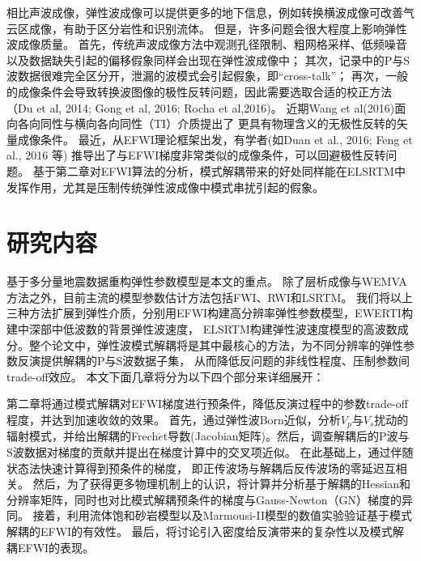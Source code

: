 相比声波成像，弹性波成像可以提供更多的地下信息，例如转换横波成像可改善气云区成像，有助于区分岩性和识别流体。
但是，许多问题会很大程度上影响弹性波成像质量。
首先，传统声波成像方法中观测孔径限制、粗网格采样、低频噪音以及数据缺失引起的偏移假象同样会出现在弹性波成像中；
其次，记录中的P与S波数据很难完全区分开，泄漏的波模式会引起假象，即“cross-talk”；
再次，一般的成像条件会导致转换波图像的极性反转问题，因此需要选取合适的校正方法（Du et al,
2014\cite{DuEtAl2014}; Gong et al, 2016\cite{GongEtAl2016}; Rocha et al,2016\cite{RochaEtAl2016a})。
近期Wang et al(2016)\cite{WangChenlongEtAl2016}面向各向同性与横向各向同性（TI）介质提出了
更具有物理含义的无极性反转的矢量成像条件。
最近，从EFWI理论框架出发，有学者(如Duan et al., 2016\cite{Duan2016}; Feng et al., 2016\cite{Feng2016} 等)
推导出了与EFWI梯度非常类似的成像条件，可以回避极性反转问题。
基于第二章对EFWI算法的分析，模式解耦带来的好处同样能在ELSRTM中发挥作用，尤其是压制传统弹性波成像中模式串扰引起的假象。


\section{研究内容}
基于多分量地震数据重构弹性参数模型是本文的重点。
除了层析成像与WEMVA方法之外，目前主流的模型参数估计方法包括FWI、RWI和LSRTM。
我们将以上三种方法扩展到弹性介质，分别用EFWI构建高分辨率弹性参数模型，EWERTI构建中深部中低波数的背景弹性波速度，
ELSRTM构建弹性波速度模型的高波数成分。整个论文中，弹性波模式解耦将是其中最核心的方法，为不同分辨率的弹性参数反演提供解耦的P与S波数据子集，
从而降低反问题的非线性程度、压制参数间trade-off效应。
本文下面几章将分为以下四个部分来详细展开：

第二章将通过模式解耦对EFWI梯度进行预条件，降低反演过程中的参数trade-off程度，并达到加速收敛的效果。
首先，通过弹性波Born近似，分析$V_p$与$V_s$扰动的
辐射模式，并给出解耦的Frech{$\acute{e}$}t导数(Jacobian矩阵)。然后，调查解耦后的P波与S波数据对梯度的贡献并提出在梯度计算中的交叉项近似。
在此基础上，通过伴随状态法快速计算得到预条件的梯度，
即正传波场与解耦后反传波场的零延迟互相关。
然后，为了获得更多物理机制上的认识，将计算并分析基于解耦的Hessian和分辨率矩阵，同时也对比模式解耦预条件的梯度与Gauss-Newton（GN）梯度的异同。
接着，利用流体饱和砂岩模型以及Marmousi-II模型的数值实验验证基于模式解耦的EFWI的有效性。
最后，将讨论引入密度给反演带来的复杂性以及模式解耦EFWI的表现。

